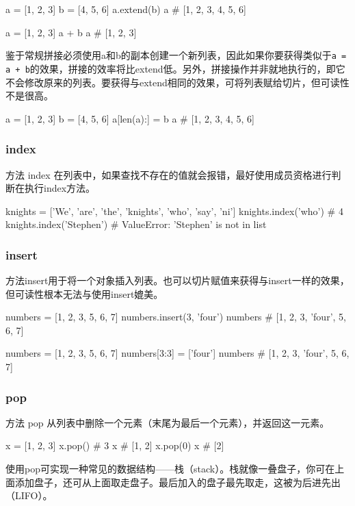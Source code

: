 \begin{pyc}
a = [1, 2, 3]
b = [4, 5, 6]
a.extend(b)
a  # [1, 2, 3, 4, 5, 6]

a = [1, 2, 3]
a + b
a  # [1, 2, 3] 
\end{pyc}
鉴于常规拼接必须使用a和b的副本创建一个新列表，因此如果你要获得类似于\verb|a = a + b|的效果，拼接的效率将比extend低。另外，拼接操作并非就地执行的，即它不会修改原来的列表。要获得与extend相同的效果，可将列表赋给切片，但可读性不是很高。

\begin{pyc}
a = [1, 2, 3]
b = [4, 5, 6]
a[len(a):] = b
a  # [1, 2, 3, 4, 5, 6]
\end{pyc}

\subsubsection{index}
方法 index 在列表中，如果查找不存在的值就会报错，最好使用成员资格进行判断在执行index方法。
\begin{pyc}
knights = ['We', 'are', 'the', 'knights', 'who', 'say', 'ni']
knights.index('who')  # 4
knights.index('Stephen')  # ValueError: 'Stephen' is not in list
\end{pyc}

\subsubsection{insert}
方法insert用于将一个对象插入列表。也可以切片赋值来获得与insert一样的效果，但可读性根本无法与使用insert媲美。
\begin{pyc}
numbers = [1, 2, 3, 5, 6, 7]
numbers.insert(3, 'four')
numbers  # [1, 2, 3, 'four', 5, 6, 7]

numbers = [1, 2, 3, 5, 6, 7]
numbers[3:3] = ['four']
numbers  # [1, 2, 3, 'four', 5, 6, 7]
\end{pyc}

\subsubsection{pop}
方法 pop 从列表中删除一个元素（末尾为最后一个元素），并返回这一元素。
\begin{pyc}
x = [1, 2, 3]
x.pop()  # 3
x  # [1, 2]
x.pop(0)
x  # [2]
\end{pyc}

使用pop可实现一种常见的数据结构——栈（stack）。栈就像一叠盘子，你可在上面添加盘子，还可从上面取走盘子。最后加入的盘子最先取走，这被为后进先出（LIFO）。

